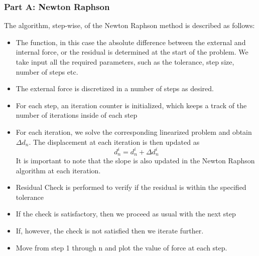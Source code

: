 \documentclass[11pt]{article}
\begin{document}
\subsubsection*{Part A:  Newton Raphson}
The algorithm, step-wise, of the Newton Raphson method is described as follows: 
\begin{itemize}
\item The function, in this case the absolute difference between the external and internal force, or the residual is determined at the start of the problem. We take input all the required parameters, such as the tolerance, step size, number of steps etc.
\item The external force is discretized in a number of steps as desired. 
\item For each step, an iteration counter is initialized, which keeps a track of the number of iterations inside of each step
\item For each iteration, we solve the corresponding linearized problem and obtain $\Delta d_{n}$. The displacement at each iteration is then updated as $$d_n^i = d_n^i + \Delta d_n^i$$It is important to note that the slope is also updated in the Newton Raphson algorithm at each iteration.
\item Residual Check is performed to verify if the residual is within the specified tolerance
\item If the check is satisfactory, then we proceed as usual with the next step
\item If, however, the check is not satisfied then we iterate further. 
\item Move from step 1 through n and plot the value of force at each step. 
\end{itemize}
\end{document}
